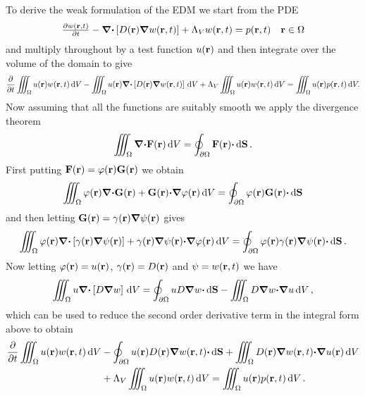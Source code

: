 \documentclass[a4paper]{article}
\numberwithin{equation}{section}
\providecommand\oiint{\oint}
\begin{document}
To derive the weak formulation of the EDM we start from the PDE
\begin{align}
\begin{matrix}
\frac{{\partial}w(\boldsymbol{\mathrm{r}},t)}{{\partial}t}-{\boldsymbol{\mathrm{\nabla}}}{\boldsymbol{\mathrm{\cdot}}}\left[D(\boldsymbol{\mathrm{r}}){\boldsymbol{\mathrm{\nabla}}}w(\boldsymbol{\mathrm{r}},t)\right]+\Lambda_V w(\boldsymbol{\mathrm{r}},t)=p(\boldsymbol{\mathrm{r}},t) &\boldsymbol{\mathrm{r}}\in\Omega 
\end{matrix}
\end{align}
and multiply throughout by a test function $u(\boldsymbol{\mathrm{r}})$ and then integrate over the volume of the domain to give 
\begin{align}
\frac{{\partial}}{{\partial}t}\iiint_{\Omega} u(\boldsymbol{\mathrm{r}}) w(\boldsymbol{\mathrm{r}},t)\,\mathrm{d}{V}
-\iiint_{\Omega} u(\boldsymbol{\mathrm{r}}){\boldsymbol{\mathrm{\nabla}}}{\boldsymbol{\mathrm{\cdot}}}\left[D(\boldsymbol{\mathrm{r}}){\boldsymbol{\mathrm{\nabla}}}w(\boldsymbol{\mathrm{r}},t)\right]\,\mathrm{d}{V}
+\Lambda_V \iiint_{\Omega } u(\boldsymbol{\mathrm{r}}) w(\boldsymbol{\mathrm{r}},t)\,\mathrm{d}{V}
=\iiint_{\Omega} u(\boldsymbol{\mathrm{r}}) p(\boldsymbol{\mathrm{r}},t)\,\mathrm{d}{V}.
\end{align}
Now assuming that all the functions are suitably smooth we apply the divergence
theorem
\begin{align}
\iiint_{\Omega} {\vnabla}{\vcdot}\vF\pr\dif{V} = \oiint_{\partial\Omega}\vF\pr{\vcdot}\dif{\vS}\,.
\end{align}
First putting $\boldsymbol{\mathrm{F}}(\boldsymbol{\mathrm{r}})=\varphi(\boldsymbol{\mathrm{r}})\boldsymbol{\mathrm{G}}(\boldsymbol{\mathrm{r}})$ we obtain
\begin{align}
\iiint_{\Omega} \varphi\pr{\vnabla}{\vcdot}\vG\pr+\vG\pr{\vcdot}{\vnabla}\varphi\pr\dif{V}
=\oiint_{\partial\Omega } \varphi\pr\vG\pr{\vcdot}\dif{\vS}
\end{align}
and then letting $\boldsymbol{\mathrm{G}}(\boldsymbol{\mathrm{r}})=\gamma(\boldsymbol{\mathrm{r}}){\boldsymbol{\mathrm{\nabla}}}\psi(\boldsymbol{\mathrm{r}})$ gives
\begin{align}
\iiint_{\Omega} \varphi\pr{\vnabla}{\vcdot}\left[\gamma\pr{\vnabla}\psi\pr\right]+\gamma\pr{\vnabla}\psi\pr{\vcdot}{\vnabla}\varphi\pr\dif{V}
=\oiint_{\partial\Omega }\varphi\pr\gamma\pr{\vnabla}\psi\pr{\vcdot}\dif{\vS}\,.
\end{align}
Now letting $\varphi(\boldsymbol{\mathrm{r}})=u(\boldsymbol{\mathrm{r}})$, $\gamma(\boldsymbol{\mathrm{r}})=D(\boldsymbol{\mathrm{r}})$ and $\psi=w(\boldsymbol{\mathrm{r}},t)$ we have
\begin{align}
\iiint_{\Omega} u{\vnabla}{\vcdot}\left[D{\vnabla}w\right]\dif{V}
=\oiint_{\partial\Omega } uD{\vnabla}w{\vcdot}\dif{\vS}
-\iiint_{\Omega} D{\vnabla}w{\vcdot}{\vnabla}u\dif{V}\,,
\end{align}
which can be used to reduce the second order derivative term in the integral form above to obtain
\begin{align}
\frac{{\partial}}{{\partial}t}\iiint_{\Omega} u\pr w\prt\dif{V}
&-\oiint_{\partial\Omega} u\pr D\pr {\vnabla}w\prt{\vcdot}\dif{\vS}
+\iiint_{\Omega} D\pr{\vnabla}w\prt{\vcdot}{\vnabla}u\pr\dif{V} \nonumber\\
&+\Lambda_V \iiint_{\Omega} u\pr w\prt\dif{V}
=\iiint_{\Omega} u\pr p\prt\dif{V}\,.
\end{align}
\end{document}
